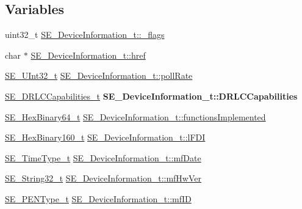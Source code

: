 \subsection*{Variables}
\begin{DoxyCompactItemize}
\item 
uint32\+\_\+t \hyperlink{group__DeviceInformation_gabb744ffd3504840eaaa09afcc5b8d831}{S\+E\+\_\+\+Device\+Information\+\_\+t\+::\+\_\+flags}
\item 
char $\ast$ \hyperlink{group__DeviceInformation_ga6a53de1479cd71c2f8125105ae4b0ac9}{S\+E\+\_\+\+Device\+Information\+\_\+t\+::href}
\item 
\hyperlink{group__UInt32_ga70bd4ecda3c0c85d20779d685a270cdb}{S\+E\+\_\+\+U\+Int32\+\_\+t} \hyperlink{group__DeviceInformation_gad3dda87fa156377fc8c597dec91356f4}{S\+E\+\_\+\+Device\+Information\+\_\+t\+::poll\+Rate}
\item 
\mbox{\label{group__DeviceInformation_ga6dc777c425b173a91e4a9c8b0a7e73b3}} 
\hyperlink{structSE__DRLCCapabilities__t}{S\+E\+\_\+\+D\+R\+L\+C\+Capabilities\+\_\+t} {\bfseries S\+E\+\_\+\+Device\+Information\+\_\+t\+::\+D\+R\+L\+C\+Capabilities}
\item 
\hyperlink{group__HexBinary64_ga718baff6d79d03afcdd37d53265c4684}{S\+E\+\_\+\+Hex\+Binary64\+\_\+t} \hyperlink{group__DeviceInformation_ga17ad36c58e0576526622d098d987ae55}{S\+E\+\_\+\+Device\+Information\+\_\+t\+::functions\+Implemented}
\item 
\hyperlink{group__HexBinary160_ga92b92aa55555bdb75f3a59060f2c1632}{S\+E\+\_\+\+Hex\+Binary160\+\_\+t} \hyperlink{group__DeviceInformation_ga48d5783d339ebf6ed3d0d95efc1d949c}{S\+E\+\_\+\+Device\+Information\+\_\+t\+::l\+F\+DI}
\item 
\hyperlink{group__TimeType_ga6fba87a5b57829b4ff3f0e7638156682}{S\+E\+\_\+\+Time\+Type\+\_\+t} \hyperlink{group__DeviceInformation_ga2e28d4743854f288b96a82c8245d91ca}{S\+E\+\_\+\+Device\+Information\+\_\+t\+::mf\+Date}
\item 
\hyperlink{group__String32_gac9f59b06b168b4d2e0d45ed41699af42}{S\+E\+\_\+\+String32\+\_\+t} \hyperlink{group__DeviceInformation_ga6ef29f550955cd0a4aad80a85243890b}{S\+E\+\_\+\+Device\+Information\+\_\+t\+::mf\+Hw\+Ver}
\item 
\hyperlink{group__PENType_ga75343bbeec563c431fef2977b4dfa4e9}{S\+E\+\_\+\+P\+E\+N\+Type\+\_\+t} \hyperlink{group__DeviceInformation_ga891b4a255b2672082d282b7bf759392e}{S\+E\+\_\+\+Device\+Information\+\_\+t\+::mf\+ID}
\item 

\end{DoxyCompactItemize}
